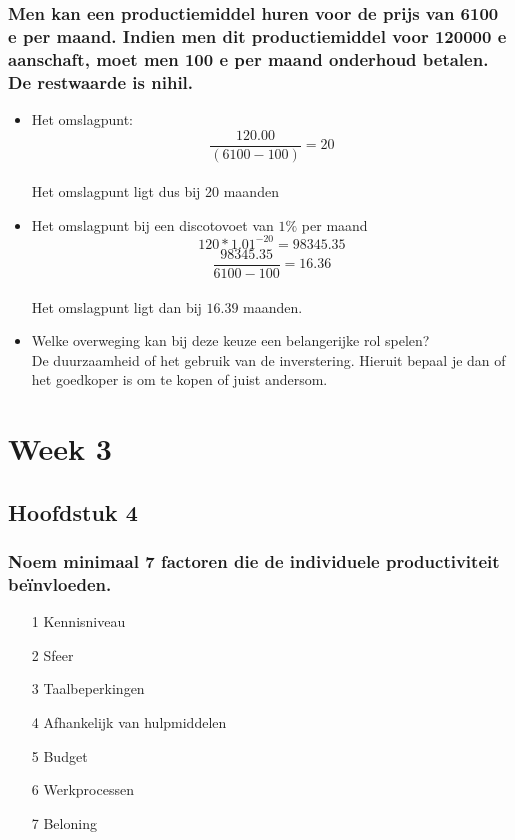 \documentclass[a4paper,titlepage]{artikel1}
\begin{document}
   \subsubsection[Opdracht 5]{Men kan een productiemiddel huren voor de
   prijs van 6100 e per maand. Indien men dit productiemiddel voor
   120000 e aanschaft, moet men 100 e per maand onderhoud betalen. De
   restwaarde is nihil.}
    \begin{itemize}
     \item Het omslagpunt:
	   \begin{displaymath}
	    \frac{120.00}{(6100-100)}=20
	   \end{displaymath}
	   \\Het omslagpunt ligt dus bij 20 maanden
     \item Het omslagpunt bij een discotovoet van $1\%$ per maand
	   \begin{displaymath}
	    120*1.01^{-20}=98345.35
	   \end{displaymath}
	   \begin{displaymath}
	    \frac{98345.35}{6100-100}=16.36
	   \end{displaymath}
	   \\
           Het omslagpunt ligt dan bij $16.39$ maanden.
     \item Welke overweging kan bij deze keuze een belangerijke rol spelen?\\De duurzaamheid of het gebruik van de inverstering. Hieruit bepaal je dan of het goedkoper is om te kopen of juist andersom.
    \end{itemize}
    
 \section{Week 3}
  \subsection{Hoofdstuk 4}
   \subsubsection[Opdracht 1]{Noem minimaal 7 factoren die de individuele productiviteit be\"invloeden.}
   \begin{itemize}
    \item[1] Kennisniveau
    \item[2] Sfeer
    \item[3] Taalbeperkingen
    \item[4] Afhankelijk van hulpmiddelen
    \item[5] Budget
    \item[6] Werkprocessen
    \item[7] Beloning
   \end{itemize}
   
\end{document}

